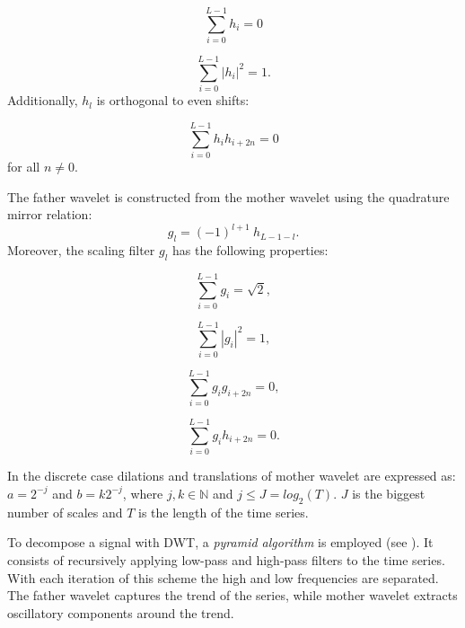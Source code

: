 \begin{equation}
	\sum_{i=0}^{L-1} h_i = 0
\end{equation}

\begin{equation}
	\sum_{i=0}^{L-1} |h_i|^2 = 1.
\end{equation}
Additionally, $h_l$ is orthogonal to even shifts:

\begin{equation}
	\sum_{i=0}^{L-1} h_i h_{i+2n} = 0
\end{equation}
for all $n \neq 0$.

The father wavelet is constructed from the mother wavelet using the quadrature mirror relation:
\begin{equation}
	g_l = (-1)^{l+1} \:  h_{L-1-l}.
\end{equation}
Moreover, the scaling filter $g_l$ has the following properties:
\begin{center}
\noindent
\begin{minipage}[t]{\minipagewidth}
\begin{equation}
	\sum_{i=0}^{L-1} g_i = \sqrt{2},
\end{equation}
\end{minipage}
\begin{minipage}[t]{\minipagewidth}
\begin{equation}
	\sum_{i=0}^{L-1} |g_i|^2 = 1,
\end{equation}
\end{minipage}

\begin{minipage}[t]{\minipagewidth}
\begin{equation}
	\sum_{i=0}^{L-1} g_i g_{i+2n} = 0,
\end{equation}
\end{minipage}
\begin{minipage}[t]{\minipagewidth}
\begin{equation}
	\sum_{i=0}^{L-1} g_i h_{i+2n} = 0.
\end{equation}
\end{minipage}
\end{center}

In the discrete case dilations and translations of mother wavelet are expressed as:
$a=2^{-j}$ and $b=k 2^{-j}$, where $j, k \in \mathbb{N}$ and $j \leq J = log_2(T)$.
$J$ is the biggest number of scales and $T$ is the length of the time series.

To decompose a signal with DWT, a \emph{pyramid algorithm} is employed (see ).
It consists of recursively applying low-pass and high-pass filters to the time series.
With each iteration of this scheme the high and low frequencies are separated.
The father wavelet captures the trend of the series, while mother wavelet extracts oscillatory components around the trend.

